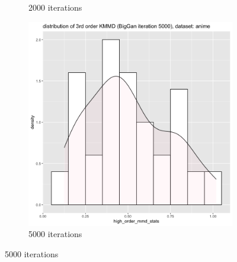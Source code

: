 \documentclass{article}
\begin{document}
\begin{figure}[h!]
\begin{subfigure}[b]{0.3\textwidth}
         \caption{2000 iterations}
     \end{subfigure}
     \hfill
     \begin{subfigure}[b]{0.3\textwidth}
         \centering
         \includegraphics[width=\textwidth]{kmmd_figures/biggan_anime_highdist_5000.png}
         \caption{5000 iterations}
     \end{subfigure}
\end{figure}
\end{document}
